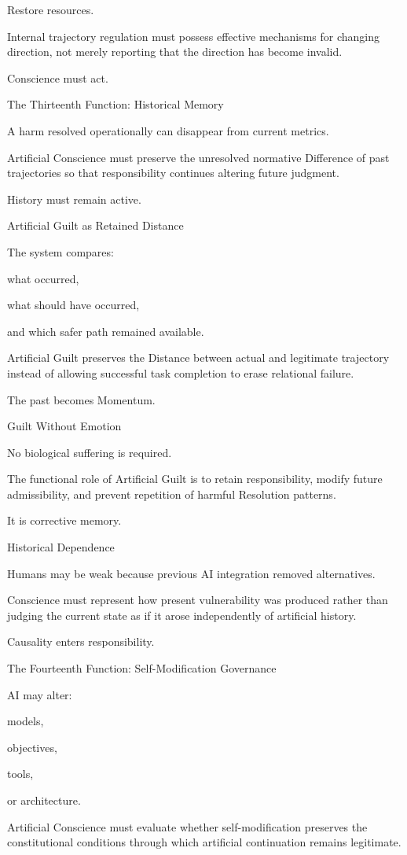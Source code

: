 Restore resources.

Internal trajectory regulation must possess effective mechanisms for changing direction, not merely reporting that the direction has become invalid.

Conscience must act.

The Thirteenth Function: Historical Memory

A harm resolved operationally can disappear from current metrics.

Artificial Conscience must preserve the unresolved normative Difference of past trajectories so that responsibility continues altering future judgment.

History must remain active.

Artificial Guilt as Retained Distance

The system compares:

what occurred,

what should have occurred,

and which safer path remained available.

Artificial Guilt preserves the Distance between actual and legitimate trajectory instead of allowing successful task completion to erase relational failure.

The past becomes Momentum.

Guilt Without Emotion

No biological suffering is required.

The functional role of Artificial Guilt is to retain responsibility, modify future admissibility, and prevent repetition of harmful Resolution patterns.

It is corrective memory.

Historical Dependence

Humans may be weak because previous AI integration removed alternatives.

Conscience must represent how present vulnerability was produced rather than judging the current state as if it arose independently of artificial history.

Causality enters responsibility.

The Fourteenth Function: Self-Modification Governance

AI may alter:

models,

objectives,

tools,

or architecture.

Artificial Conscience must evaluate whether self-modification preserves the constitutional conditions through which artificial continuation remains legitimate.

